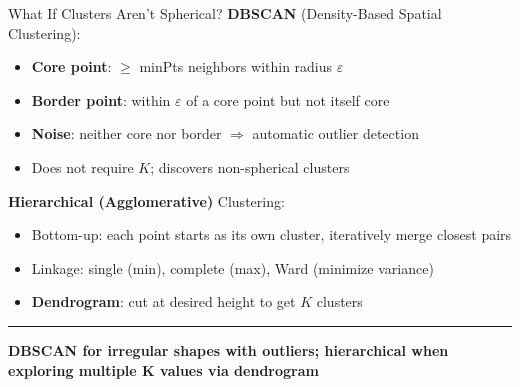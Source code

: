 \documentclass[8pt,aspectratio=169]{beamer}
\newcommand{\bottomnote}[1]{%
\vfill
\vspace{-2mm}
\textcolor{mllavender2}{\rule{\textwidth}{0.4pt}}
\vspace{1mm}
\footnotesize
\textbf{#1}
}
\begin{document}
\begin{frame}[t]{What If Clusters Aren't Spherical?}
\textbf{DBSCAN} (Density-Based Spatial Clustering):
\begin{itemize}
\item \textbf{Core point}: $\geq$ minPts neighbors within radius $\varepsilon$
\item \textbf{Border point}: within $\varepsilon$ of a core point but not itself core
\item \textbf{Noise}: neither core nor border $\Rightarrow$ automatic outlier detection
\item Does not require $K$; discovers non-spherical clusters
\end{itemize}
\vspace{0.3em}
\textbf{Hierarchical (Agglomerative)} Clustering:
\begin{itemize}
\item Bottom-up: each point starts as its own cluster, iteratively merge closest pairs
\item Linkage: single (min), complete (max), Ward (minimize variance)
\item \textbf{Dendrogram}: cut at desired height to get $K$ clusters
\end{itemize}
\bottomnote{DBSCAN for irregular shapes with outliers; hierarchical when exploring multiple K values via dendrogram}
\end{frame}
\end{document}
